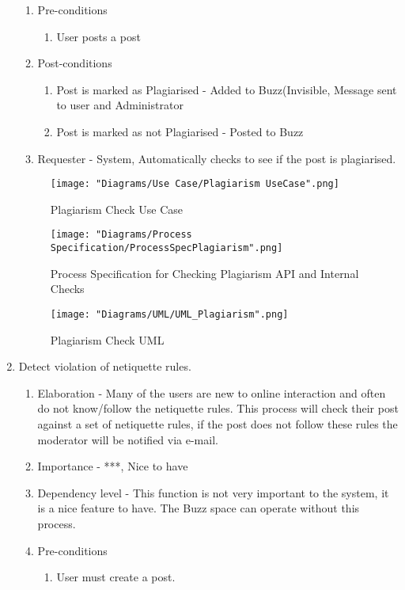 \documentclass[12pt]{article}
\begin{document}
\begin{enumerate}
\begin{enumerate}
    \item Pre-conditions
    \begin{enumerate}
    	\item User posts a post
    \end{enumerate}
        \item Post-conditions
    \begin{enumerate}
    	\item Post is marked as Plagiarised - Added to Buzz(Invisible, Message sent to user and Administrator
    	\item Post is marked as not Plagiarised - Posted to Buzz
    \end{enumerate}
    \item Requester - System, Automatically checks to see if the post is plagiarised.
  \end{enumerate}
\begin{figure}[h]
	\centering
	\texttt{[image: "Diagrams/Use Case/Plagiarism UseCase".png]}
	\caption{Plagiarism Check Use Case}
\end{figure}
\begin{figure}[h]
	\centering
	\texttt{[image: "Diagrams/Process Specification/ProcessSpecPlagiarism".png]}
	\caption{Process Specification for Checking Plagiarism API and Internal Checks}
\end{figure}
\begin{figure}[h]
	\centering
	\texttt{[image: "Diagrams/UML/UML\_Plagiarism".png]}
	\caption{Plagiarism Check UML}
\end{figure}
\clearpage %
   \item Detect violation of netiquette rules. %
	\begin{enumerate}
  	\item Elaboration - Many of the users are new to online interaction and often do not know/follow the netiquette rules. This process will check their post against a set of netiquette rules, if the post does not follow these rules the moderator will be notified via e-mail.
   	 	\item Importance - ***, Nice to have
   	 	\item Dependency level - This function is not very important to the system, it is a nice feature to have. The Buzz space can operate without this process.
   	 	\item Pre-conditions
   		\begin{enumerate}
    		\item User must create a post.

\end{enumerate}
\end{enumerate}
\end{enumerate}
\end{document}
